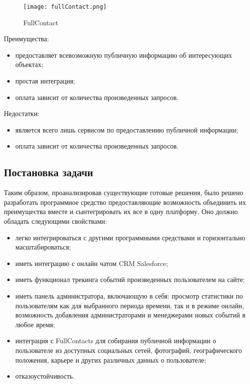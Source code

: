 \begin{figure}[h]
\centering
  \texttt{[image: fullContact.png]}  
  \caption{FullContact}
	\label{fig:fc}
\end{figure}

Преимущества:
\begin{itemize}
\item предоставляет всевозможную публичную информацию об интересующих объектах;
\item простая интеграция;
\item оплата зависит от количества произведенных запросов.
\end{itemize}
Недостатки:
\begin{itemize}
\item является всего лишь сервисом по предоставлению публичной информации;
\item оплата зависит от количества произведенных запросов.
\end{itemize}

\pagebreak
\subsection{Постановка задачи}
\label{sub:alternatives:task}
Таким образом, проанализировав существующие готовые решения, было решено разработать программное средство предоставляющие возможность объединить их преимущества вместе и сынтегрировать их все в одну платформу. Оно должно обладать следующими свойствами:

\begin{itemize}
\item легко интегрироваться с другими программными средствами и горизонтально масштабироваться; 
\item иметь интеграцию с онлайн чатом CRM Salesforce;
\item иметь функционал трекинга событий произведенных пользователем на сайте;
\item иметь панель администратора, включающую в себя: просмотр статистики по пользователям как для выбранного периода времени, так и в режиме онлайн, возможность добавления администраторами и менеджерами новых событий в любое время;
\item интеграция с FullContacts для собирания публичной информации о пользователе из доступных социальных сетей, фотографий, географического положения, карьере и других различных данных о пользователе;
\item отказоустойчивость.
\end{itemize}
